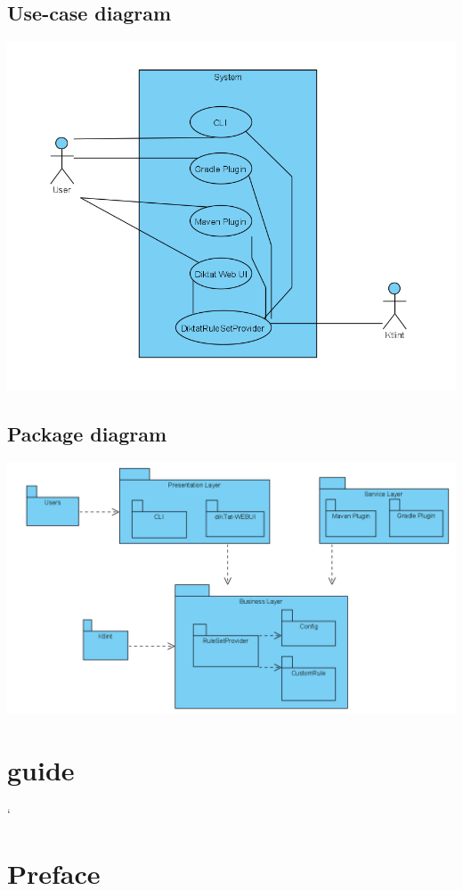 \subsection{Use-case diagram}
\includegraphics[scale=0.8]{pictures/useCase.png}
\subsection{Package diagram}
\includegraphics[scale=0.65]{pictures/package.png}

\section*{guide}

\lstMakeShortInline[basicstyle=\ttfamily\bfseries]`

\section*{\textbf{Preface}}

